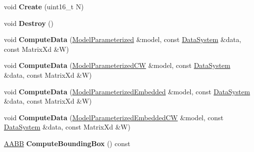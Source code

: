 \begin{DoxyCompactItemize}
\item 
\hypertarget{struct_d_r_d_s_p_1_1_reduced_data_system_a5161bf6e29b60d324025eb56a811217e}{void {\bfseries Create} (uint16\-\_\-t N)}\label{struct_d_r_d_s_p_1_1_reduced_data_system_a5161bf6e29b60d324025eb56a811217e}

\item 
\hypertarget{struct_d_r_d_s_p_1_1_reduced_data_system_ab1eafb140901723d22dc06ca95fb323e}{void {\bfseries Destroy} ()}\label{struct_d_r_d_s_p_1_1_reduced_data_system_ab1eafb140901723d22dc06ca95fb323e}

\item 
\hypertarget{struct_d_r_d_s_p_1_1_reduced_data_system_ae791e9522d7fb6d589c9e1f001eba314}{void {\bfseries Compute\-Data} (\hyperlink{struct_d_r_d_s_p_1_1_model_parameterized}{Model\-Parameterized} \&model, const \hyperlink{struct_d_r_d_s_p_1_1_data_system}{Data\-System} \&data, const Matrix\-Xd \&W)}\label{struct_d_r_d_s_p_1_1_reduced_data_system_ae791e9522d7fb6d589c9e1f001eba314}

\item 
\hypertarget{struct_d_r_d_s_p_1_1_reduced_data_system_a09565a90b382698cd1e24f9bb83c9115}{void {\bfseries Compute\-Data} (\hyperlink{struct_d_r_d_s_p_1_1_model_parameterized_c_w}{Model\-Parameterized\-C\-W} \&model, const \hyperlink{struct_d_r_d_s_p_1_1_data_system}{Data\-System} \&data, const Matrix\-Xd \&W)}\label{struct_d_r_d_s_p_1_1_reduced_data_system_a09565a90b382698cd1e24f9bb83c9115}

\item 
\hypertarget{struct_d_r_d_s_p_1_1_reduced_data_system_ad88bc475b0f2a10539ba5b079c63d28f}{void {\bfseries Compute\-Data} (\hyperlink{struct_d_r_d_s_p_1_1_model_parameterized_embedded}{Model\-Parameterized\-Embedded} \&model, const \hyperlink{struct_d_r_d_s_p_1_1_data_system}{Data\-System} \&data, const Matrix\-Xd \&W)}\label{struct_d_r_d_s_p_1_1_reduced_data_system_ad88bc475b0f2a10539ba5b079c63d28f}

\item 
\hypertarget{struct_d_r_d_s_p_1_1_reduced_data_system_a8a1973de2415d07ac2041b97fbe3e7aa}{void {\bfseries Compute\-Data} (\hyperlink{struct_d_r_d_s_p_1_1_model_parameterized_embedded_c_w}{Model\-Parameterized\-Embedded\-C\-W} \&model, const \hyperlink{struct_d_r_d_s_p_1_1_data_system}{Data\-System} \&data, const Matrix\-Xd \&W)}\label{struct_d_r_d_s_p_1_1_reduced_data_system_a8a1973de2415d07ac2041b97fbe3e7aa}

\item 
\hypertarget{struct_d_r_d_s_p_1_1_reduced_data_system_a21853627f8229be7b5ec278faa31257e}{\hyperlink{struct_d_r_d_s_p_1_1_a_a_b_b}{A\-A\-B\-B} {\bfseries Compute\-Bounding\-Box} () const }\label{struct_d_r_d_s_p_1_1_reduced_data_system_a21853627f8229be7b5ec278faa31257e}


\end{DoxyCompactItemize}
